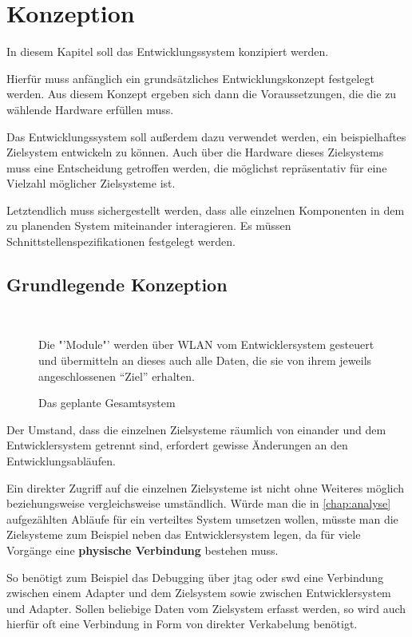 \chapter{Konzeption}\label{chap:konzeption}
\minitoc
In diesem Kapitel soll das Entwicklungssystem konzipiert werden.

Hierfür muss anfänglich ein grundsätzliches Entwicklungskonzept festgelegt
werden. Aus diesem Konzept ergeben sich dann die Voraussetzungen, die die zu
wählende Hardware erfüllen muss.

Das Entwicklungssystem soll außerdem dazu verwendet werden, ein
beispielhaftes Zielsystem entwickeln zu können. Auch über die Hardware dieses
Zielsystems muss eine Entscheidung getroffen werden, die möglichst
repräsentativ für eine Vielzahl möglicher Zielsysteme ist.

Letztendlich muss sichergestellt werden, dass alle einzelnen Komponenten in dem
zu planenden System miteinander interagieren. Es müssen
Schnittstellenspezifikationen festgelegt werden.
\section{Grundlegende Konzeption}
\begin{figure}[!ht]
\centering
\def\svgwidth{0.88\columnwidth}
\\
\caption{Das geplante Gesamtsystem}{Die "'Module"' werden über WLAN
vom Entwicklersystem gesteuert und übermitteln an dieses auch alle
Daten, die sie von ihrem jeweils angeschlossenen "`Ziel"' erhalten.}
\label{fig:sys}
\end{figure}
Der Umstand, dass die einzelnen Zielsysteme räumlich von einander und dem
Entwicklersystem getrennt sind, erfordert gewisse Änderungen an den
Entwicklungsabläufen.

Ein direkter Zugriff auf die einzelnen Zielsysteme ist nicht ohne Weiteres
möglich beziehungsweise vergleichsweise umständlich. Würde man die in
\autoref{chap:analyse} aufgezählten Abläufe für ein verteiltes System umsetzen
wollen, müsste man die Zielsysteme zum Beispiel neben das Entwicklersystem
legen, da für viele Vorgänge eine \textbf{physische Verbindung} bestehen muss.

So benötigt zum Beispiel das Debugging über \gls{jtag} oder \gls{swd} eine
Verbindung zwischen einem Adapter und dem Zielsystem sowie zwischen
Entwicklersystem und Adapter. Sollen beliebige Daten vom Zielsystem erfasst
werden, so wird auch hierfür oft eine Verbindung in Form von direkter
Verkabelung benötigt.

